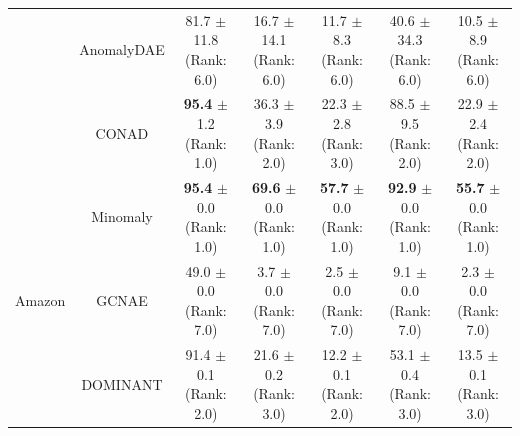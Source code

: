 \begin{table}[H]
\begin{tabular}{|l|c|c|c|c|c|c|}
    & AnomalyDAE & \makecell{81.7 $\pm$ 11.8 \\[1pt] \tiny (Rank: 6.0)} & \makecell{16.7 $\pm$ 14.1 \\[1pt] \tiny (Rank: 6.0)} & \makecell{11.7 $\pm$ 8.3 \\[1pt] \tiny (Rank: 6.0)} & \makecell{40.6 $\pm$ 34.3 \\[1pt] \tiny (Rank: 6.0)} & \makecell{10.5 $\pm$ 8.9 \\[1pt] \tiny (Rank: 6.0)} \\
    & CONAD & \makecell{\textbf{95.4} $\pm$ 1.2 \\[1pt] \tiny (Rank: 1.0)} & \makecell{36.3 $\pm$ 3.9 \\[1pt] \tiny (Rank: 2.0)} & \makecell{22.3 $\pm$ 2.8 \\[1pt] \tiny (Rank: 3.0)} & \makecell{88.5 $\pm$ 9.5 \\[1pt] \tiny (Rank: 2.0)} & \makecell{22.9 $\pm$ 2.4 \\[1pt] \tiny (Rank: 2.0)} \\ \hline
    \multirow{7}{*}{Amazon}
    & Minomaly & \makecell{\textbf{95.4} $\pm$ 0.0 \\[1pt] \tiny (Rank: 1.0)} & \makecell{\textbf{69.6} $\pm$ 0.0 \\[1pt] \tiny (Rank: 1.0)} & \makecell{\textbf{57.7} $\pm$ 0.0 \\[1pt] \tiny (Rank: 1.0)} & \makecell{\textbf{92.9} $\pm$ 0.0 \\[1pt] \tiny (Rank: 1.0)} & \makecell{\textbf{55.7} $\pm$ 0.0 \\[1pt] \tiny (Rank: 1.0)} \\
    & GCNAE & \makecell{49.0 $\pm$ 0.0 \\[1pt] \tiny (Rank: 7.0)} & \makecell{3.7 $\pm$ 0.0 \\[1pt] \tiny (Rank: 7.0)} & \makecell{2.5 $\pm$ 0.0 \\[1pt] \tiny (Rank: 7.0)} & \makecell{9.1 $\pm$ 0.0 \\[1pt] \tiny (Rank: 7.0)} & \makecell{2.3 $\pm$ 0.0 \\[1pt] \tiny (Rank: 7.0)} \\
    & DOMINANT & \makecell{91.4 $\pm$ 0.1 \\[1pt] \tiny (Rank: 2.0)} & \makecell{21.6 $\pm$ 0.2 \\[1pt] \tiny (Rank: 3.0)} & \makecell{12.2 $\pm$ 0.1 \\[1pt] \tiny (Rank: 2.0)} & \makecell{53.1 $\pm$ 0.4 \\[1pt] \tiny (Rank: 3.0)} & \makecell{13.5 $\pm$ 0.1 \\[1pt] \tiny (Rank: 3.0)} \\

\end{tabular}
\end{table}
